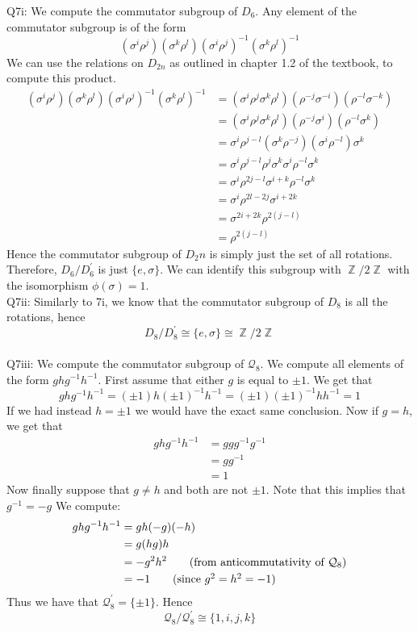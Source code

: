 \documentclass[letterpaper]{article}
\DeclareMathOperator{\Z}{\mathbb{Z}}
\begin{document}
\noindent
Q7i: We compute the commutator subgroup of $D_6$. Any element of the commutator subgroup is of the form $$(\sigma^i \rho^j)(\sigma^k \rho^l)(\sigma^i \rho^j)^{-1}(\sigma^k \rho^l)^{-1}$$ We can use the relations on $D_{2n}$ as outlined in chapter 1.2 of the textbook, to compute this product. 
\begin{align*}
    (\sigma^i \rho^j)(\sigma^k \rho^l)(\sigma^i \rho^j)^{-1}(\sigma^k \rho^l)^{-1} & = (\sigma^i \rho^j \sigma^k \rho^l)(\rho^{-j}\sigma^{-i})(\rho^{-l}\sigma^{-k})
    \\ & = (\sigma^i \rho^j \sigma^k \rho^l)(\rho^{-j}\sigma^{i})(\rho^{-l}\sigma^{k})
    \\ & = \sigma^{i} \rho^{j-l}(\sigma^k \rho^{-j})(\sigma^{i}\rho^{-l})\sigma^{k}
    \\ & = \sigma^{i}\rho^{j-l}\rho^j \sigma^k\sigma^i\rho^{-l}\sigma^k
    \\ & = \sigma^i \rho^{2j-l}\sigma^{i+k}\rho^{-l}\sigma^k
    \\ & = \sigma^i \rho^{2l-2j} \sigma^{i+2k}
    \\ & = \sigma^{2i+2k}\rho^{2(j-l)}
    \\ & = \rho^{2(j-l)}
\end{align*} Hence the commutator subgroup of $D_2n$ is simply just the set of all rotations. Therefore, $D_6 / D_6^\prime$ is just $\{e,\sigma\}$. We can identify this subgroup with $\Z / 2\Z$ with the isomorphism $\phi(\sigma) = 1$. 
\newline \\ \noindent 
Q7ii: Similarly to 7i, we know that the commutator subgroup of $D_8$ is all the rotations, hence $$D_8 / D_8^\prime \cong \{e,\sigma\} \cong \Z / 2\Z$$
\newline \\ \noindent
Q7iii:  We compute the commutator subgroup of $\mathcal{Q}_8$. We compute all elements of the form $ghg^{-1}h^{-1}$. First assume that either $g$ is equal to $\pm 1$. We get that $$ghg^{-1}h^{-1} = (\pm 1)h(\pm 1)^{-1}h^{-1}= (\pm 1)(\pm 1)^{-1}hh^{-1} = 1$$
If we had instead $h=\pm 1$ we would have the exact same conclusion. 
Now if $g=h$, we get that 
\begin{align*}
    ghg^{-1}h^{-1} & = ggg^{-1}g^{-1}
    \\ & = g g^{-1}
    \\ & = 1
\end{align*}
Now finally suppose that $g\neq h$ and both are not $\pm 1$. Note that this implies that $g^{-1} = -g$
We compute:
\begin{align*}
    ghg^{-1}h^{-1} & = gh(-g)(-h)
    \\ & = g(hg)h
    \\ & = -g^2h^2 \tag{from anticommutativity of $\mathcal{Q}_8$}
    \\ & = -1 \tag{since $g^2=h^2=-1$}
\end{align*}
Thus we have that $\mathcal{Q}_8^\prime = \{\pm 1\}$. Hence $$\mathcal{Q}_8 / \mathcal{Q}_8^\prime \cong \{1,i,j,k\}$$
\end{document}
